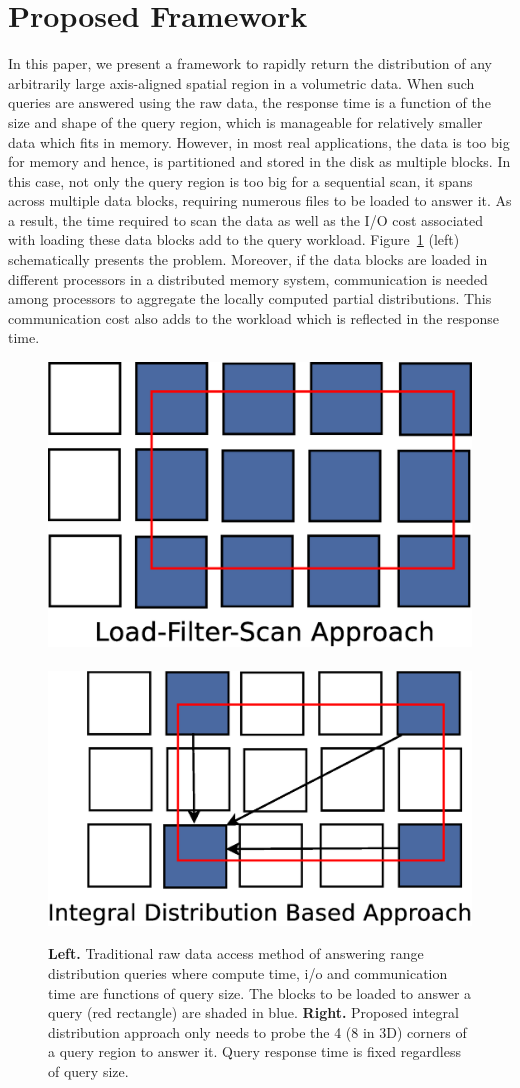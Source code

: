 \section{Proposed Framework}
\label{sec:distqueryframework}
In this paper, we present a framework to rapidly return the distribution of any arbitrarily large axis-aligned spatial region in a volumetric data. When such queries are answered using the raw data, the response time is a function of the size and shape of the query region, which is manageable for relatively smaller data which fits in memory. However, in most real applications, the data is too big for memory and hence, is partitioned and stored in the disk as multiple blocks. In this case, not only the query region is too big for a sequential scan, it spans across multiple data blocks, requiring numerous files to be loaded to answer it. As a result, the time required to scan the data as well as the I/O cost associated with loading these data blocks add to the query workload. Figure~\ref{fig:ih_mainbenefit} (left) schematically presents the problem. Moreover, if the data blocks are loaded in different processors in a distributed memory system, communication is needed among processors to aggregate the locally computed partial distributions. This communication cost also adds to the workload which is reflected in the response time.
\begin{figure}[tb]
\centering
	\includegraphics[width = 0.45\linewidth, keepaspectratio = true]{images/eps/loadfilterscan.eps}%
	~
	\includegraphics[width = 0.49\linewidth, keepaspectratio = true]{images/eps/mainbenefit.eps}%
	\caption{{\bf Left.} Traditional raw data access method of answering range distribution queries where compute time, i/o and communication time are functions of query size. The blocks to be loaded to answer a query (red rectangle) are shaded in blue. {\bf Right.} Proposed integral distribution approach only needs to probe the 4 (8 in 3D) corners of a query region to answer it. Query response time is fixed regardless of query size.}	
	\label{fig:ih_mainbenefit}
\end{figure}

